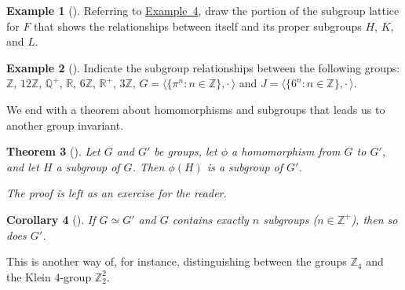 \documentclass[10pt,]{book}
\theoremstyle{plain}
\newtheorem{theorem}{Theorem}[section]
\newtheorem{corollary}[theorem]{Corollary}
\theoremstyle{definition}
\theoremstyle{definition}
\theoremstyle{definition}
\newtheorem{example}[theorem]{Example}
\theoremstyle{definition}
\numberwithin{equation}{section}
\def\Z{\mathbb{Z}}
\def\R{\mathbb{R}}
\def\Q{\mathbb{Q}}
\begin{document}
\begin{example}[]\label{example-39}
Referring to \hyperref[FHKL]{Example~4}, draw the portion of the subgroup lattice for \(F\) that shows the relationships between itself and its proper subgroups \(H\), \(K\), and \(L\).%
\end{example}
\begin{example}[]\label{example-40}
Indicate the subgroup relationships between the following groups: \(\Z\), \(12\Z\), \(\Q^+\), \(\R\), \(6\Z\), \(\R^+\), \(3\Z\), \(G=\langle \{\pi^n:n\in \Z\},\cdot\,\rangle\) and \(J=\langle \{6^n:n\in \Z\},\cdot\,\rangle .\)%
\end{example}
We end with a theorem about homomorphisms and subgroups that leads us to another group invariant.%
\begin{theorem}[{}]\label{imsubgp}
Let \(G\) and \(G'\) be groups, let \(\phi\) a homomorphism from \(G\) to \(G'\), and let \(H\) a subgroup of \(G\). Then \(\phi(H)\) is a subgroup of \(G'\).%
\par
\emph{The proof is left as an exercise for the reader.}%
\end{theorem}
\begin{corollary}[{}]\label{corollary-3}
If \(G\simeq G'\) and \(G\) contains exactly \(n\) subgroups (\(n\in \Z^+\)), then so does \(G'\).%
\end{corollary}
This is another way of, for instance, distinguishing between the groups \(\Z_4\) and the Klein 4-group \(\Z_2^2\).%
\end{document}
